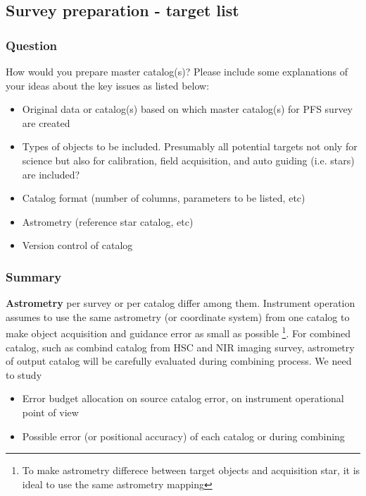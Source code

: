\documentclass[a4paper,notitlepage]{article}
\begin{document}
\subsection{Survey preparation - target list}

\subsubsection{Question}

How would you prepare master catalog(s)?  Please
          include some explanations of your ideas about the key
          issues as listed below:
\begin{itemize}
    \item Original data or catalog(s) based on which master
             catalog(s) for PFS survey are created
    \item Types of objects to be included. Presumably all
             potential targets not only for science but also for
             calibration, field acquisition, and auto guiding
             (i.e. stars) are included?
    \item Catalog format (number of columns, parameters to be
             listed, etc)
    \item Astrometry (reference star catalog, etc)
    \item Version control of catalog
\end{itemize}


\subsubsection{Summary}

{\bf Astrometry} per survey or per catalog differ among them. Instrument 
operation assumes to use the same astrometry (or coordinate system) from 
one catalog to make object acquisition and guidance error as small as 
possible
\footnote{To make astrometry differece between target objects and acquisition 
star, it is ideal to use the same astrometry mapping}. 
For combined catalog, such as combind catalog from HSC and NIR 
imaging survey, astrometry of output catalog will be carefully evaluated 
during combining process. We need to study 
\begin{itemize}
  \item Error budget allocation on source catalog error, on instrument operational point of view
  \item Possible error (or positional accuracy) of each catalog or during combining
\end{itemize}
\end{document}
